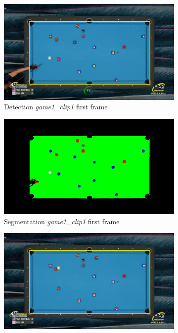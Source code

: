 \begin{figure}[H]
	\centering
	\begin{subfigure}[b]{0.48\textwidth}
		\centering
		\includegraphics[width=\textwidth]{images/Detection/game1_clip1_detected_balls_first_frame.jpg}
		\caption{Detection \textit{game1\_clip1} first frame}
		\label{fig: game1_clip1_first_frame_detected}
	\end{subfigure}
	\begin{subfigure}[b]{0.48\textwidth}
		\centering
		\includegraphics[width=\textwidth]{images/Segmentation/game1_clip1_segmented_balls_first_frame.jpg}
		\caption{Segmentation \textit{game1\_clip1} first frame}
		\label{fig: game1_clip1_first_frame_segmented}
	\end{subfigure}
	\begin{subfigure}[b]{0.48\textwidth}
		\centering
		\includegraphics[width=\textwidth]{images/Detection/game1_clip1_detected_balls_last_frame.jpg}

\end{subfigure}
\end{figure}
